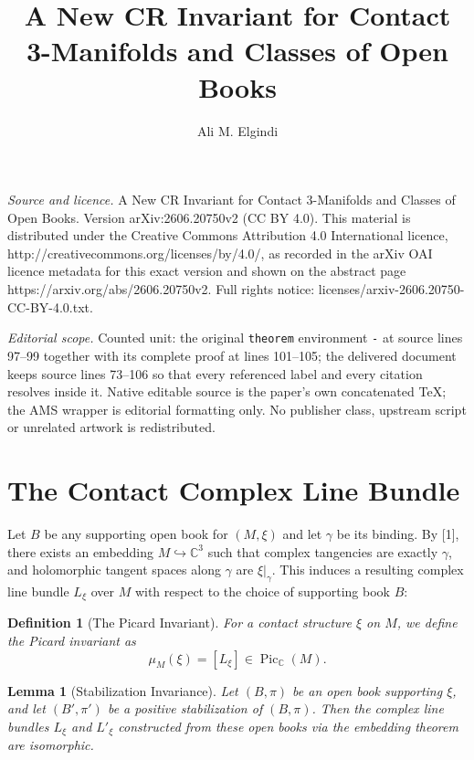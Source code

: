 \documentclass[10pt,a4paper]{amsart}
\newtheorem{lemma}[theorem]{Lemma}
\newtheorem{definition}[theorem]{Definition}
\newcommand{\C}{\mathbb{C}}
\newcommand{\Pic}{\operatorname{Pic}}
\begin{document}
\title[A New CR Invariant for Contact 3-Manifolds and Classes of Op]{A New CR Invariant for Contact 3-Manifolds and Classes of Open Books}
\author{Ali M. Elgindi}
\date{}
\maketitle
\noindent\emph{Source and licence.} A New CR Invariant for Contact 3-Manifolds and Classes of Open Books. Version arXiv:2606.20750v2 (CC BY 4.0). This material is distributed under the Creative Commons Attribution 4.0 International licence, http://creativecommons.org/licenses/by/4.0/, as recorded in the arXiv OAI licence metadata for this exact version and shown on the abstract page https://arxiv.org/abs/2606.20750v2. Full rights notice: licenses/arxiv-2606.20750-CC-BY-4.0.txt.\par\smallskip
\noindent\textit{Editorial scope.} Counted unit: the original \texttt{theorem} environment \texttt{-} at source lines 97--99 together with its complete proof at lines 101--105; the delivered document keeps source lines 73--106 so that every referenced label and every citation resolves inside it. Native editable source is the paper's own concatenated TeX; the AMS wrapper is editorial formatting only. No publisher class, upstream script or unrelated artwork is redistributed.
\section{The Contact Complex Line Bundle}

Let $B$ be any supporting open book for $(M,\xi)$ and let $\gamma$ be its binding. By [1], there exists an embedding $M \hookrightarrow \C^3$ such that complex tangencies are exactly $\gamma$, and holomorphic tangent spaces along $\gamma$ are $\xi|_\gamma$. This induces a resulting complex line bundle $L_\xi$ over $M$ with respect to the choice of supporting book $B$:

\begin{definition}[The Picard Invariant]
For a contact structure $\xi$ on $M$, we define the Picard invariant as
\[
\mu_M(\xi) = [L_\xi] \in \Pic_{\C}(M).
\]
\end{definition}

\begin{lemma}[Stabilization Invariance]
\label{lem:stab}
Let $(B, \pi)$ be an open book supporting $\xi$, and let $(B', \pi')$ be a positive stabilization of $(B, \pi)$. Then the complex line bundles $L_\xi$ and $L'_\xi$ constructed from these open books via the embedding theorem \cite{Elgindi2025} are isomorphic.
\end{lemma}
\end{document}
